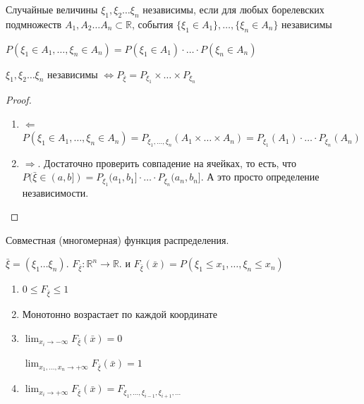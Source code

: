 \begin{definition}
    Случайные величины $\xi_1, \xi_2 \ldots \xi_n$ независимы, если для любых
    борелевских подмножеств $A_1, A_2 \ldots A_n \subset \mathbb{R}$, события
    $\{ \xi_1 \in A_1 \}, \ldots, \{ \xi_n \in A_n \}$ независимы

    \begin{remark}
        $P(\xi_1 \in A_1, \ldots, \xi_n \in A_n) = P(\xi_1 \in A_1) \cdot \ldots \cdot P(\xi_n \in A_n)$
    \end{remark}
\end{definition}

\begin{theorem}
    $\xi_1, \xi_2 \ldots \xi_n$ независимы $\Longleftrightarrow P_{\bar{\xi}} = P_{\xi_1} \times \ldots \times P_{\xi_n}$
\end{theorem}

\begin{proof}
    \begin{enumerate}
        \item $\Leftarrow$ $P(\xi_1 \in A_1, \ldots, \xi_n \in A_n) = P_{\xi_1, \ldots, \xi_n} (A_1 \times \ldots \times A_n) = P_{\xi_1} (A_1) \cdot \ldots \cdot P_{\xi_n} (A_n)$
        \item {
            $\Rightarrow$. Достаточно проверить совпадение на ячейках, то есть, что $P(\bar{\xi} \in (a, b]) = P_{\xi_1} (a_1, b_1] \cdot
            \ldots \cdot P_{\xi_n} (a_n, b_n]$. А это просто определение независимости.
        }
    \end{enumerate}
\end{proof}

\begin{definition}
    Совместная (многомерная) функция распределения.

    $\bar{\xi} = (\xi_1 \ldots \xi_n)$. $F_{\bar{\xi}} : \mathbb{R}^n \to \mathbb{R}$. и
    $F_{\bar{\xi}} (\bar{x}) = P(\xi_1 \leqslant x_1,  \ldots, \xi_n \leqslant x_n) $
\end{definition}

\begin{properties}
    \begin{enumerate}
        \item {
            $0 \leqslant F_{\bar{\xi}} \leqslant 1$
        }
        \item {
            Монотонно возрастает по каждой координате
        }
        \item {
            $\lim_{x_i \to -\infty} F_{\bar{\xi}} (\bar{x}) = 0$

            $\lim_{x_1, \ldots, x_n \to +\infty} F_{\bar{\xi}} (\bar{x}) = 1$
        }
        \item {
            $\lim_{x_i \to +\infty} F_{\bar{\xi}} (\bar{x}) = F_{\xi_1, \ldots, \xi_{i - 1}, \xi_{i + 1}, \ldots}$
        }
    \end{enumerate}
\end{properties}

